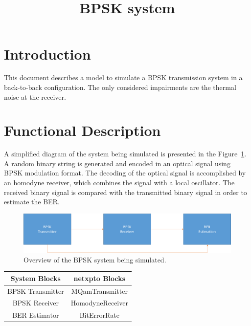 \documentclass[a4paper]{article}
\title{BPSK system}
\author{ }
\date{ }
\newcommand{\onlyinsubfile}[1]{#1}
\newcommand{\notinsubfile}[1]{}
\begin{document}
\renewcommand{\onlyinsubfile}[1]{}
\renewcommand{\notinsubfile}[1]{#1}

\maketitle

\section{Introduction}

This document describes a model to simulate a BPSK transmission system in a back-to-back configuration.
The only considered impairments are the thermal noise at the receiver.

\section{Functional Description}

A simplified diagram of the system being simulated is presented in the Figure~\ref{fig:homodynesystem}.
A random binary string is generated and encoded in an optical signal using BPSK modulation format.
The decoding of the optical signal is accomplished by an homodyne receiver, which combines the signal with a local oscillator.
The received binary signal is compared with the transmitted binary signal in order to estimate the BER.

\begin{figure}[h]
\centering
\includegraphics[width=\linewidth]{bpskdiagram.png}
\caption{Overview of the BPSK system being simulated.}
\label{fig:homodynesystem}
\end{figure}

\begin{table}[H]
\centering
\begin{tabular}{c|c}
System Blocks    & netxpto Blocks   \\ \hline
BPSK Transmitter & MQamTransmitter  \\
BPSK Receiver    & HomodyneReceiver \\
BER Estimator    & BitErrorRate
\end{tabular}
\end{table}
\end{document}
